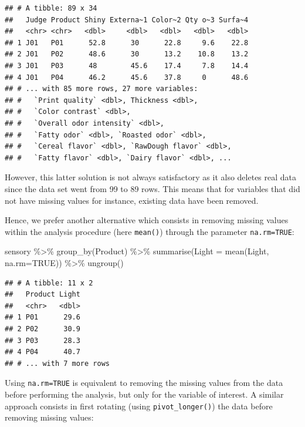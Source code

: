 \documentclass[
]{krantz}
\makeatletter
\newenvironment{Shaded}{\begin{snugshade}}{\end{snugshade}}
\newcommand{\AttributeTok}[1]{\textcolor[rgb]{0.61,0.61,0.61}{#1}}
\newcommand{\ConstantTok}[1]{\textcolor[rgb]{0,0,0}{#1}}
\newcommand{\FunctionTok}[1]{\textcolor[rgb]{0,0,0}{#1}}
\newcommand{\NormalTok}[1]{#1}
\newcommand{\SpecialCharTok}[1]{\textcolor[rgb]{0,0,0}{#1}}
\newenvironment{kframe}{%
\medskip{}
\setlength{\fboxsep}{.8em}
 \def\at@end@of@kframe{}%
 \ifinner\ifhmode%
  \def\at@end@of@kframe{\end{minipage}}%
  \begin{minipage}{\columnwidth}%
 \fi\fi%
 \def\FrameCommand##1{\hskip\@totalleftmargin \hskip-\fboxsep
 \colorbox{shadecolor}{##1}\hskip-\fboxsep
     \hskip-\linewidth \hskip-\@totalleftmargin \hskip\columnwidth}%
 \MakeFramed {\advance\hsize-\width
   \@totalleftmargin\z@ \linewidth\hsize
   \@setminipage}}%
 {\par\unskip\endMakeFramed%
 \at@end@of@kframe}
\renewenvironment{Shaded}{\begin{kframe}}{\end{kframe}}
\makeatother
\begin{document}
\begin{verbatim}
## # A tibble: 89 x 34
##   Judge Product Shiny Externa~1 Color~2 Qty o~3 Surfa~4
##   <chr> <chr>   <dbl>     <dbl>   <dbl>   <dbl>   <dbl>
## 1 J01   P01      52.8      30      22.8     9.6    22.8
## 2 J01   P02      48.6      30      13.2    10.8    13.2
## 3 J01   P03      48        45.6    17.4     7.8    14.4
## 4 J01   P04      46.2      45.6    37.8     0      48.6
## # ... with 85 more rows, 27 more variables:
## #   `Print quality` <dbl>, Thickness <dbl>,
## #   `Color contrast` <dbl>,
## #   `Overall odor intensity` <dbl>,
## #   `Fatty odor` <dbl>, `Roasted odor` <dbl>,
## #   `Cereal flavor` <dbl>, `RawDough flavor` <dbl>,
## #   `Fatty flavor` <dbl>, `Dairy flavor` <dbl>, ...
\end{verbatim}

However, this latter solution is not always satisfactory as it also deletes real data since the data set went from 99 to 89 rows. This means that for variables that did not have missing values for instance, existing data have been removed.

Hence, we prefer another alternative which consists in removing missing values within the analysis procedure (here \texttt{mean()}) through the parameter \texttt{na.rm=TRUE}:

\begin{Shaded}
\begin{Highlighting}[]
\NormalTok{sensory }\SpecialCharTok{\%\textgreater{}\%} 
  \FunctionTok{group\_by}\NormalTok{(Product) }\SpecialCharTok{\%\textgreater{}\%} 
  \FunctionTok{summarise}\NormalTok{(}\AttributeTok{Light =} \FunctionTok{mean}\NormalTok{(Light, }\AttributeTok{na.rm=}\ConstantTok{TRUE}\NormalTok{)) }\SpecialCharTok{\%\textgreater{}\%} 
  \FunctionTok{ungroup}\NormalTok{()}
\end{Highlighting}
\end{Shaded}

\begin{verbatim}
## # A tibble: 11 x 2
##   Product Light
##   <chr>   <dbl>
## 1 P01      29.6
## 2 P02      30.9
## 3 P03      28.3
## 4 P04      40.7
## # ... with 7 more rows
\end{verbatim}

Using \texttt{na.rm=TRUE} is equivalent to removing the missing values from the data before performing the analysis, but only for the variable of interest. A similar approach consists in first rotating (using \texttt{pivot\_longer()}) the data before removing missing values:
\end{document}
